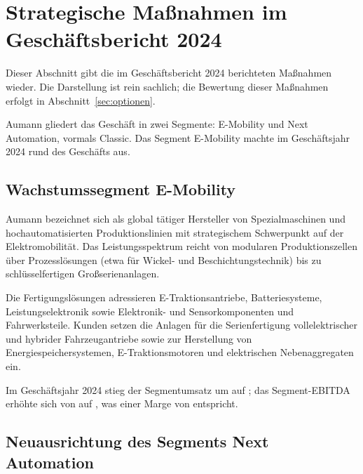 \section{Strategische Ma{\ss}nahmen im Gesch\"aftsbericht 2024}
\label{sec:strategie}

Dieser Abschnitt gibt die im Gesch\"aftsbericht 2024 berichteten Ma{\ss}nahmen
wieder. Die Darstellung ist rein sachlich; die Bewertung dieser Ma{\ss}nahmen
erfolgt in Abschnitt~\ref{sec:optionen}.

Aumann gliedert das Gesch\"aft in zwei Segmente: E-Mobility und Next
Automation, vormals Classic. Das Segment E-Mobility machte
im Gesch\"aftsjahr 2024 rund \Pct{\AnteilEMobility} des Gesch\"afts
aus.

\subsection{Wachstumssegment E-Mobility}
\label{subsec:e-mobility}

Aumann bezeichnet sich als global t\"atiger Hersteller von Spezialmaschinen
und hochautomatisierten Produktionslinien mit strategischem Schwerpunkt auf
der Elektromobilit\"at. Das Leistungsspektrum reicht von
modularen Produktionszellen \"uber Prozessl\"osungen (etwa f\"ur Wickel- und
Beschichtungstechnik) bis zu schl\"usselfertigen
Gro{\ss}serienanlagen.

Die Fertigungsl\"osungen adressieren E-Traktionsantriebe, Batteriesysteme,
Leistungselektronik sowie Elektronik- und Sensorkomponenten und
Fahrwerksteile. Kunden setzen die Anlagen f\"ur die
Serienfertigung vollelektrischer und hybrider Fahrzeugantriebe sowie zur
Herstellung von Energiespeichersystemen, E-Traktionsmotoren und elektrischen
Nebenaggregaten ein.

Im Gesch\"aftsjahr 2024 stieg der Segmentumsatz um
\Pct{\UmsatzEMobilityDeltaZFIV} auf \MioEUR{\UmsatzEMobilityZFIV}; das
Segment-EBITDA erh\"ohte sich von \MioEUR{\EbitdaEMobilityZFIII} auf
\MioEUR{\EbitdaEMobilityZFIV}, was einer Marge von
\Pct{\EbitdaMargeEMobilityZFIV} entspricht.

\subsection{Neuausrichtung des Segments Next Automation}
\label{subsec:next-automation}

